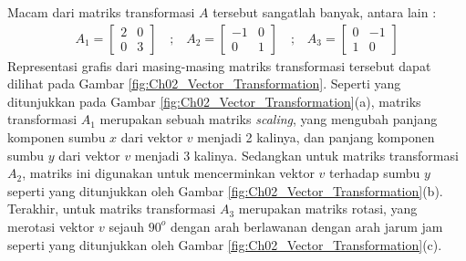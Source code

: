     Macam dari matriks transformasi $A$ tersebut sangatlah banyak, antara lain :
    \begin{equation}
    	\label{eqn:Ch02_Transformation_Matrix}
    	\begin{split}
    		A_1 =
    		\begin{bmatrix}
    			2 & 0 \\ 0 & 3
    		\end{bmatrix}
    		\quad \text{;} \quad
    		A_2 =
    		\begin{bmatrix}
    			-1 & 0 \\ 0 & 1
    		\end{bmatrix}
    		\quad \text{;} \quad
    		A_3 =
    		\begin{bmatrix}
    			0 & -1 \\ 1 & 0
    		\end{bmatrix}
    	\end{split}
    \end{equation}
    Representasi grafis dari masing-masing matriks transformasi tersebut dapat dilihat pada Gambar \ref{fig:Ch02_Vector_Transformation}. Seperti yang ditunjukkan pada Gambar \ref{fig:Ch02_Vector_Transformation}(a), matriks transformasi $A_1$ merupakan sebuah matriks \textit{scaling}, yang mengubah panjang komponen sumbu $x$ dari vektor $v$ menjadi 2 kalinya, dan panjang komponen sumbu $y$ dari vektor $v$ menjadi 3 kalinya. Sedangkan untuk matriks transformasi $A_2$, matriks ini digunakan untuk mencerminkan vektor $v$ terhadap sumbu $y$ seperti yang ditunjukkan oleh Gambar \ref{fig:Ch02_Vector_Transformation}(b). Terakhir, untuk matriks transformasi $A_3$ merupakan matriks rotasi, yang merotasi vektor $v$ sejauh $90^o$ dengan arah berlawanan dengan arah jarum jam seperti yang ditunjukkan oleh Gambar \ref{fig:Ch02_Vector_Transformation}(c).
    
